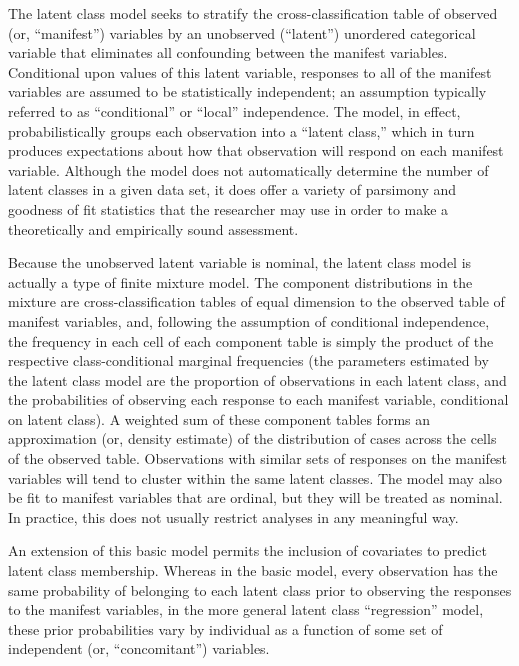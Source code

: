 \documentclass[letterpaper,12pt]{article}
\begin{document}
The latent class model seeks to stratify the cross-classification table of observed (or, ``manifest'') variables by an unobserved (``latent'') unordered categorical variable that eliminates all confounding between the manifest variables.  Conditional upon values of this latent variable, responses to all of the manifest variables are assumed to be statistically independent; an assumption typically referred to as ``conditional'' or ``local'' independence.  The model, in effect, probabilistically groups each observation into a ``latent class,'' which in turn produces expectations about how that observation will respond on each manifest variable. Although the model does not automatically determine the number of latent classes in a given data set, it does offer a variety of parsimony and goodness of fit statistics that the researcher may use in order to make a theoretically and empirically sound assessment.

Because the unobserved latent variable is nominal, the latent class model is actually a type of finite mixture model.  The component distributions in the mixture are cross-classification tables of equal dimension to the observed table of manifest variables, and, following the assumption of conditional independence, the frequency in each cell of each component table is simply the product of the respective class-conditional marginal frequencies (the parameters estimated by the latent class model are the proportion of observations in each latent class, and the probabilities of observing each response to each manifest variable, conditional on latent class). A weighted sum of these component tables forms an approximation (or, density estimate) of the distribution of cases across the cells of the observed table. Observations with similar sets of responses on the manifest variables will tend to cluster within the same latent classes.  The model may also be fit to manifest variables that are ordinal, but they will be treated as nominal. In practice, this does not usually restrict analyses in any meaningful way.

An extension of this basic model permits the inclusion of covariates to predict latent class membership.  Whereas in the basic model, every observation has the same probability of belonging to each latent class prior to observing the responses to the manifest variables, in the more general latent class ``regression'' model, these prior probabilities vary by individual as a function of some set of independent (or, ``concomitant'') variables.
\end{document}
